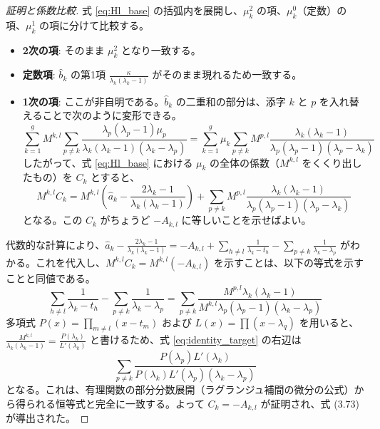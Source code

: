 \begin{proof}[証明と係数比較]
式 \eqref{eq:Hl_base} の括弧内を展開し、$\mu_k^2$ の項、$\mu_k^0$（定数）の項、$\mu_k^1$ の項に分けて比較する。
\begin{itemize}
    \item \textbf{2次の項}: そのまま $\mu_k^2$ となり一致する。
    \item \textbf{定数項}: $\hat{b}_k$ の第1項 $\frac{\kappa}{\lambda_k(\lambda_k-1)}$ がそのまま現れるため一致する。
    \item \textbf{1次の項}: ここが非自明である。$\hat{b}_k$ の二重和の部分は、添字 $k$ と $p$ を入れ替えることで次のように変形できる。
    \begin{equation*}
        \sum_{k=1}^g M^{k,l} \sum_{p \neq k} \frac{\lambda_p(\lambda_p-1)\mu_p}{\lambda_k(\lambda_k-1)(\lambda_k-\lambda_p)} = \sum_{k=1}^g \mu_k \sum_{p \neq k} M^{p,l} \frac{\lambda_k(\lambda_k-1)}{\lambda_p(\lambda_p-1)(\lambda_p-\lambda_k)}
    \end{equation*}
    したがって、式 \eqref{eq:Hl_base} における $\mu_k$ の全体の係数（$M^{k,l}$ をくくり出したもの）を $C_k$ とすると、
    \begin{equation}
        M^{k,l} C_k = M^{k,l} \left( \hat{a}_k - \frac{2\lambda_k-1}{\lambda_k(\lambda_k-1)} \right) + \sum_{p \neq k} M^{p,l} \frac{\lambda_k(\lambda_k-1)}{\lambda_p(\lambda_p-1)(\lambda_p-\lambda_k)}
    \end{equation}
    となる。この $C_k$ がちょうど $-A_{k,l}$ に等しいことを示せばよい。
\end{itemize}
代数的な計算により、$\hat{a}_k - \frac{2\lambda_k-1}{\lambda_k(\lambda_k-1)} = - A_{k,l} + \sum_{h \neq l} \frac{1}{\lambda_k-t_h} - \sum_{p \neq k} \frac{1}{\lambda_k-\lambda_p}$ がわかる。これを代入し、$M^{k,l}C_k = M^{k,l}(-A_{k,l})$ を示すことは、以下の等式を示すことと同値である。
\begin{equation}
    \sum_{h \neq l} \frac{1}{\lambda_k-t_h} - \sum_{p \neq k} \frac{1}{\lambda_k-\lambda_p} = \sum_{p \neq k} \frac{M^{p,l} \lambda_k(\lambda_k-1)}{M^{k,l} \lambda_p(\lambda_p-1)(\lambda_k-\lambda_p)} \label{eq:identity_target}
\end{equation}
多項式 $P(x) = \prod_{m \neq l}(x-t_m)$ および $L(x) = \prod (x-\lambda_q)$ を用いると、$\frac{M^{k,l}}{\lambda_k(\lambda_k-1)} = \frac{P(\lambda_k)}{L'(\lambda_k)}$ と書けるため、式 \eqref{eq:identity_target} の右辺は
\begin{equation*}
    \sum_{p \neq k} \frac{P(\lambda_p)L'(\lambda_k)}{P(\lambda_k)L'(\lambda_p)(\lambda_k-\lambda_p)}
\end{equation*}
となる。これは、有理関数の部分分数展開（ラグランジュ補間の微分の公式）から得られる恒等式と完全に一致する。よって $C_k = -A_{k,l}$ が証明され、式 (3.73) が導出された。
\end{proof}

